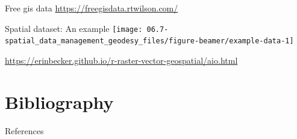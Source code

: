 \documentclass[11pt,dvipsnames,ignorenonframetext,aspectratio=169]{beamer}
\newif\ifbibliography
\begin{document}
\begin{frame}{Free gis data}
\protect\hypertarget{free-gis-data}{}
\url{https://freegisdata.rtwilson.com/}
\end{frame}

\begin{frame}{Spatial dataset: An example}
\protect\hypertarget{spatial-dataset-an-example}{}
\texttt{[image: 06.7-spatial\_data\_management\_geodesy\_files/figure-beamer/example-data-1]}
\end{frame}

\begin{frame}{}
\protect\hypertarget{section-5}{}
\url{https://erinbecker.github.io/r-raster-vector-geospatial/aio.html}
\end{frame}

\hypertarget{bibliography}{%
\section{Bibliography}\label{bibliography}}

\begin{frame}{References}
\protect\hypertarget{references}{}
\end{frame}

          \begin{frame}[allowframebreaks]{}
    \bibliographytrue
    
    \end{frame}
  
\end{document}
